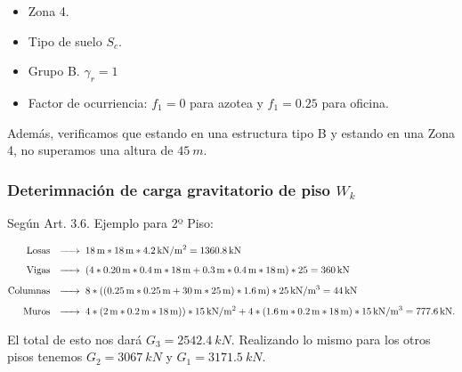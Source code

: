 \documentclass[../main.tex]{subfiles}
\begin{document}
\begin{itemize}
  \item Zona 4.
  \item Tipo de suelo \textbf{$S_c$}.
  \item Grupo B. $\gamma_r = 1$
  \item Factor de ocurriencia: $f_1=0$ para azotea y  $f_1=0.25$ para oficina.
\end{itemize}

Además, verificamos que estando en una estructura tipo B y estando en una Zona 4,
no superamos una altura de $\SI{45}{m}$. 


\subsubsection{Deterimnación de carga gravitatorio de piso $W_k$}

Según Art. 3.6. Ejemplo para 2º Piso:

\begin{align*}
  \text{Losas} \hspace{0.25cm} &\xrightarrow{\hspace*{0.5cm}} \hspace{0.1cm} 
    \SI{18}{m} * \SI{18}{m} * \SI{4.2}{kN /m^2} = \SI{1360.8}{kN} \\[5pt] 
  \text{Vigas} \hspace{0.25cm} &\xrightarrow{\hspace*{0.5cm}} \hspace{0.1cm} (4 * 
    \SI{0.20}{m} * \SI{0.4}{m} * \SI{18}{m} + \SI{0.3}{m}*\SI{0.4}{m}*\SI{18}{m}) * 25 
    = \SI{360}{kN} \\[5pt]
  \text{Columnas} \hspace{0.25cm} &\xrightarrow{\hspace*{0.5cm}} \hspace{0.1cm}
    8*((\SI{0.25}{m}*\SI{0.25}{m}+\SI{30}{m}*\SI{25}{m})*\SI{1.6}{m})*\SI{25}{kN /m^3} 
    = \SI{44}{kN} \\[5pt]
  \text{Muros} \hspace{0.25cm} &\xrightarrow{\hspace*{0.5cm}} \hspace{0.1cm}
    4*(\SI{2}{m}*\SI{0.2}{m}*\SI{18}{m}))*\SI{15}{kN /m^2} + 4 * (\SI{1.6}{m} * 
    \SI{0.2}{m} * \SI{18}{m})*\SI{15}{kN /m^3} = \SI{777.6}{kN}
.\end{align*}

El total de esto nos dará $G_3=\SI{2542.4}{kN}$. Realizando lo mismo para los otros
pisos tenemos $G_2 = \SI{3067}{kN}$ y $G_1 = \SI{3171.5}{kN}$.
\end{document}
